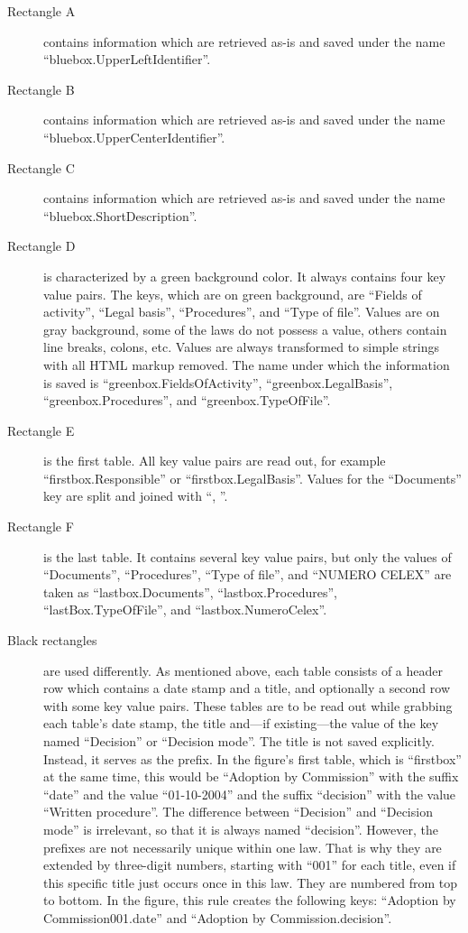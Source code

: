 \documentclass{scrartcl}
\begin{document}
\begin{description}
\item[Rectangle A] contains information which are retrieved as-is and saved under the name ``bluebox.UpperLeftIdentifier''.
\item[Rectangle B] contains information which are retrieved as-is and saved under the name ``bluebox.UpperCenterIdentifier''.
\item[Rectangle C] contains information which are retrieved as-is and saved under the name ``bluebox.ShortDescription''.
\item[Rectangle D] is characterized by a green background color. It always contains four key value pairs. The keys, which are on green background, are ``Fields of activity'', ``Legal basis'', ``Procedures'', and ``Type of file''. Values are on gray background, some of the laws do not possess a value, others contain line breaks, colons, etc. Values are always transformed to simple strings with all HTML markup removed. The name under which the information is saved is ``greenbox.FieldsOfActivity'', ``greenbox.LegalBasis'', ``greenbox.Procedures'', and ``greenbox.TypeOfFile''.
\item[Rectangle E] is the first table. All key value pairs are read out, for example ``firstbox.Responsible'' or ``firstbox.LegalBasis''. Values for the ``Documents'' key are split and joined with ``, ''.
\item[Rectangle F] is the last table. It contains several key value pairs, but only the values of ``Documents'', ``Procedures'', ``Type of file'', and ``NUMERO CELEX'' are taken as ``lastbox.Documents'', ``lastbox.Procedures'', ``lastBox.TypeOfFile'', and ``lastbox.NumeroCelex''.
\label{sec:numberingschema}
\item[Black rectangles] are used differently. As mentioned above, each table consists of a header row which contains a date stamp and a title, and optionally a second row with some key value pairs. These tables are to be read out while grabbing each table's date stamp, the title and---if existing---the value of the key named ``Decision'' or ``Decision mode''. The title is not saved explicitly. Instead, it serves as the prefix. In the figure's first table, which is ``firstbox'' at the same time, this would be ``Adoption by Commission'' with the suffix ``date'' and the value ``01-10-2004'' and the suffix ``decision'' with the value ``Written procedure''. The difference between ``Decision'' and ``Decision mode'' is irrelevant, so that it is always named ``decision''. However, the prefixes are not necessarily unique within one law. That is why they are extended by three-digit numbers, starting with ``001'' for each title, even if this specific title just occurs once in this law. They are numbered from top to bottom. In the figure, this rule creates the following keys: ``Adoption by Commission001.date'' and ``Adoption by Commission.decision''.

\end{description}
\end{document}

